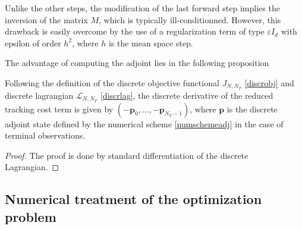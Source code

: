  \begin{rmk}
  Unlike the other steps, the modification of the last forward step implies the inversion of the matrix $M$, which is typically ill-conditionned. However, this drawback is easily overcome by the use of a regularization term of type $\varepsilon I_d$ with epsilon of order $h^2$, where $h$ is the mean space step.
 \end{rmk}
 
 The advantage of computing the adjoint lies in the following proposition
 \begin{prop}
 Following the definition of the discrete objective functional $J_{N,N_T}$ \eqref{discrobj} and discrete lagrangian $\mathcal{L}_{N,N_T}$ \eqref{discrlag}, the discrete derivative of the reduced tracking cost term is given by $\left(-\mathbf{p}_0,\ldots,-\mathbf{p}_{N_T-1}\right)$, where $\mathbf{p}$ is the discrete adjoint state defined by the numerical scheme \eqref{numschemeadj} in the case of terminal observations.
 \end{prop}
\begin{proof}
 The proof is done by standard differentiation of the discrete Lagrangian.
\end{proof}


\subsection{Numerical treatment of the optimization problem}
